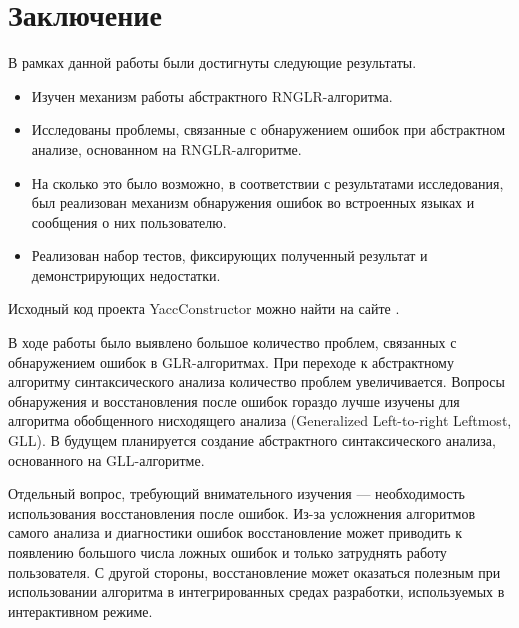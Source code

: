 \section*{Заключение}
В рамках данной работы были достигнуты следующие результаты.
\begin{itemize}
    \item Изучен механизм работы абстрактного RNGLR-алгоритма.
    \item Исследованы проблемы, связанные с обнаружением ошибок при абстрактном 
    анализе, основанном на RNGLR-алгоритме.
    \item На сколько это было возможно, в соответствии с результатами исследования, 
    был реализован механизм обнаружения ошибок во встроенных языках и сообщения о 
    них пользователю.
    \item Реализован набор тестов, фиксирующих полученный результат и демонстрирующих 
    недостатки.
\end{itemize}

Исходный код проекта YaccConstructor можно найти на сайте . 

В ходе работы было выявлено большое количество проблем, связанных с обнаружением 
ошибок в GLR-алгоритмах. При переходе к абстрактному алгоритму синтаксического 
анализа количество проблем увеличивается. Вопросы обнаружения и восстановления 
после ошибок гораздо лучше изучены для алгоритма обобщенного нисходящего анализа 
(Generalized Left-to-right Leftmost, GLL). В будущем планируется создание абстрактного 
синтаксического анализа, основанного на GLL-алгоритме. 

Отдельный вопрос, требующий внимательного изучения — необходимость использования 
восстановления после ошибок. Из-за усложнения алгоритмов самого анализа и диагностики 
ошибок восстановление может приводить к появлению большого числа ложных ошибок и 
только затруднять работу пользователя. С другой стороны, восстановление может 
оказаться полезным при использовании алгоритма в интегрированных средах разработки, 
используемых в интерактивном режиме.

